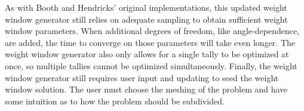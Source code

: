 As with Booth and Hendricks'
original implementations, this updated weight window generator still relies on
adequate sampling to obtain sufficient weight window parameters. When additional
degrees of freedom, like angle-dependence, are added, the time
to converge on those parameters will take even longer. The weight window
generator also only allows for a single tally to be optimized at once, so
multiple tallies cannot be optimized simultaneously. Finally, the weight window
generator still requires user input and updating to seed the weight
window solution. The user must choose the meshing of the problem and have some
intuition as to how the problem should be subdivided. %

